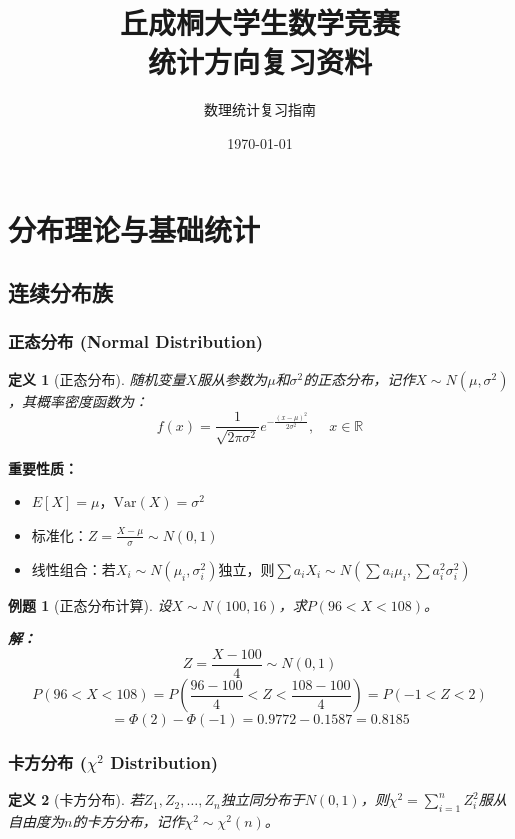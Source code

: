 \documentclass[12pt,a4paper]{article}
\title{\textbf{丘成桐大学生数学竞赛\\统计方向复习资料}}
\author{数理统计复习指南}
\date{\today}
\newtheorem{definition}{定义}[section]
\newtheorem{example}{例题}[section]
\theoremstyle{remark}
\begin{document}
\maketitle
\tableofcontents
\newpage

\section{分布理论与基础统计}

\subsection{连续分布族}

\subsubsection{正态分布 (Normal Distribution)}

\begin{definition}[正态分布]
随机变量$X$服从参数为$\mu$和$\sigma^2$的正态分布，记作$X \sim N(\mu, \sigma^2)$，其概率密度函数为：
$$f(x) = \frac{1}{\sqrt{2\pi\sigma^2}} e^{-\frac{(x-\mu)^2}{2\sigma^2}}, \quad x \in \mathbb{R}$$
\end{definition}

\textbf{重要性质：}
\begin{itemize}
\item $E[X] = \mu$，$\text{Var}(X) = \sigma^2$
\item 标准化：$Z = \frac{X-\mu}{\sigma} \sim N(0,1)$
\item 线性组合：若$X_i \sim N(\mu_i, \sigma_i^2)$独立，则$\sum a_i X_i \sim N(\sum a_i \mu_i, \sum a_i^2 \sigma_i^2)$
\end{itemize}

\begin{example}[正态分布计算]
设$X \sim N(100, 16)$，求$P(96 < X < 108)$。

\textbf{解：}
$$Z = \frac{X-100}{4} \sim N(0,1)$$
$$P(96 < X < 108) = P\left(\frac{96-100}{4} < Z < \frac{108-100}{4}\right) = P(-1 < Z < 2)$$
$$= \Phi(2) - \Phi(-1) = 0.9772 - 0.1587 = 0.8185$$
\end{example}

\subsubsection{卡方分布 ($\chi^2$ Distribution)}

\begin{definition}[卡方分布]
若$Z_1, Z_2, \ldots, Z_n$独立同分布于$N(0,1)$，则$\chi^2 = \sum_{i=1}^n Z_i^2$服从自由度为$n$的卡方分布，记作$\chi^2 \sim \chi^2(n)$。
\end{definition}
\end{document}
